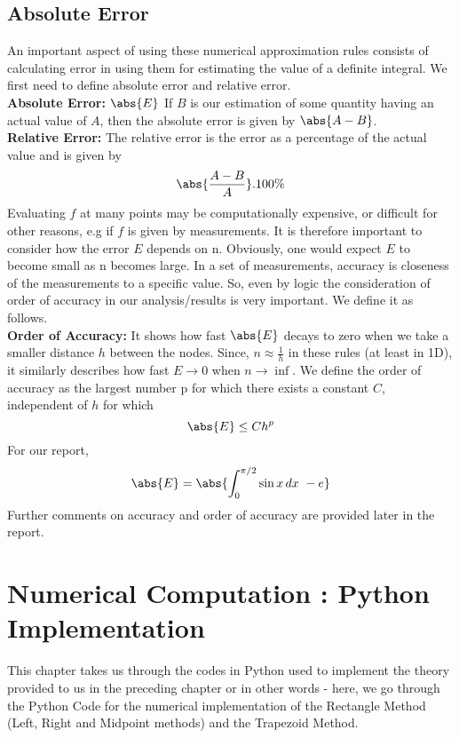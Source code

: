 \documentclass[a4paper, 12pt]{report}
\begin{document}
    \section{Absolute Error}
    An important aspect of using these numerical approximation rules consists of calculating error in using them for estimating the value of a definite integral. We first need to define absolute error and relative error.\\
    \textbf{Absolute Error: $\abs{E}$} If $B$ is our estimation of some quantity having an actual value of $A$, then the absolute error is given by $\abs{A-B}$.\\
    \textbf{Relative Error:} The relative error is the error as a percentage of the actual value and is given by 
    \begin{equation}
        \abs{\frac{A-B}{A}}.100\%
    \end{equation}
    Evaluating $f$ at many points may be computationally expensive, or difficult for other reasons, e.g if $f$ is given by measurements. It is therefore important to consider how the error $E$ depends on n. Obviously, one would expect $E$ to become small as n becomes large. In a set of measurements, accuracy is closeness of the measurements to a specific value. So, even by logic the consideration of order of accuracy in our analysis/results is very important. We define it as follows.\\
    \textbf{Order of Accuracy:} It shows how fast $\abs{E}$ decays to zero when we take a smaller distance $h$ between the nodes. Since, $n\approx \frac{1}{h}$ in these rules (at least in 1D), it similarly describes how fast $E\to 0$ when $n \to \inf$. We define the order of accuracy as the largest number p for which there exists a constant $C$, independent of $h$ for which 
    \begin{equation}
        \abs{E} \leq C h^{p}
    \end{equation}
    For our report,
    \begin{equation}
        \abs{E} = \abs{\int_{0}^{\pi/2}\sin{x}\,dx\ - e}
    \end{equation}
    Further comments on accuracy and order of accuracy are provided later in the report.
 \chapter{ Numerical Computation : Python Implementation}
This chapter takes us through the codes in Python used to implement the theory provided to us in the preceding chapter or in other words - here, we go through the Python Code for the numerical implementation of the Rectangle Method (Left, Right and Midpoint methods) and the Trapezoid Method.
\end{document}

